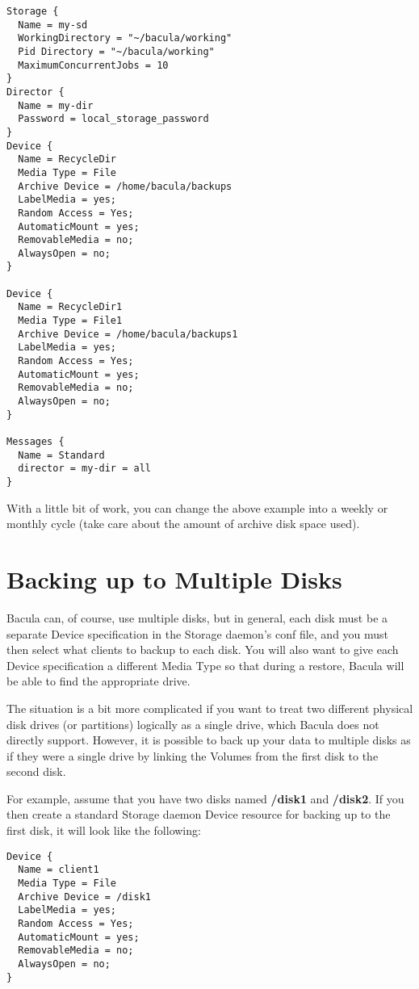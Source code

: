 \footnotesize
\begin{verbatim}
Storage {
  Name = my-sd
  WorkingDirectory = "~/bacula/working"
  Pid Directory = "~/bacula/working"
  MaximumConcurrentJobs = 10
}
Director {
  Name = my-dir
  Password = local_storage_password
}
Device {
  Name = RecycleDir
  Media Type = File
  Archive Device = /home/bacula/backups
  LabelMedia = yes;
  Random Access = Yes;
  AutomaticMount = yes;
  RemovableMedia = no;
  AlwaysOpen = no;
}

Device {
  Name = RecycleDir1
  Media Type = File1
  Archive Device = /home/bacula/backups1
  LabelMedia = yes;
  Random Access = Yes;
  AutomaticMount = yes;
  RemovableMedia = no;
  AlwaysOpen = no;
}

Messages {
  Name = Standard
  director = my-dir = all
}
\end{verbatim}
\normalsize

With a little bit of work, you can change the above example into a weekly or
monthly cycle (take care about the amount of archive disk space used). 

\label{MultipleDisks}
\section{Backing up to Multiple Disks}

Bacula can, of course, use multiple disks, but in general, each disk must be a
separate Device specification in the Storage daemon's conf file, and you must
then select what clients to backup to each disk. You will also want to
give each Device specification a different Media Type so that during
a restore, Bacula will be able to find the appropriate drive.

The situation is a bit more complicated if you want to treat two different
physical disk drives (or partitions) logically as a single drive, which
Bacula does not directly support.  However, it is possible to back up your
data to multiple disks as if they were a single drive by linking the
Volumes from the first disk to the second disk.

For example, assume that you have two disks named {\bf /disk1} and {\bf
/disk2}. If you then create a standard Storage daemon Device resource for
backing up to the first disk, it will look like the following: 

\footnotesize
\begin{verbatim}
Device {
  Name = client1
  Media Type = File
  Archive Device = /disk1
  LabelMedia = yes;
  Random Access = Yes;
  AutomaticMount = yes;
  RemovableMedia = no;
  AlwaysOpen = no;
}
\end{verbatim}
\normalsize

